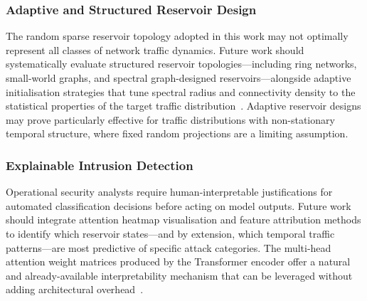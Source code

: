 \documentclass[5p,times]{elsarticle}
\begin{document}
	\subsubsection{Adaptive and Structured Reservoir Design}
	
	The random sparse reservoir topology adopted in this work
	may not optimally represent all classes of network traffic
	dynamics. Future work should systematically evaluate
	structured reservoir topologies---including ring networks,
	small-world graphs, and spectral graph-designed
	reservoirs---alongside adaptive initialisation strategies
	that tune spectral radius and connectivity density to the
	statistical properties of the target traffic
	distribution~\cite{gallicchio2020,gallicchio2017,scardapane2017}.
	Adaptive reservoir designs may prove particularly effective
	for traffic distributions with non-stationary temporal
	structure, where fixed random projections are a limiting
	assumption.
	
	\subsubsection{Explainable Intrusion Detection}
	
	Operational security analysts require human-interpretable
	justifications for automated classification decisions before
	acting on model outputs. Future work should integrate
	attention heatmap visualisation and feature attribution
	methods to identify which reservoir states---and by
	extension, which temporal traffic patterns---are most
	predictive of specific attack categories. The multi-head
	attention weight matrices produced by the Transformer
	encoder offer a natural and already-available
	interpretability mechanism that can be leveraged without
	adding architectural
	overhead~\cite{rtids2022,bilstm_attn2023,liu2020hierarchical}.
	
\end{document}
